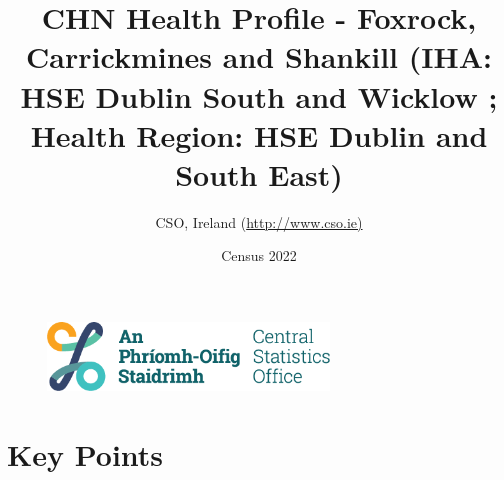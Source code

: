 \documentclass{article}
\title{CHN Health Profile - Foxrock, Carrickmines and Shankill (IHA: HSE Dublin South and Wicklow ;  Health Region: HSE Dublin and South East) }
\date{Census 2022}
\author{CSO, Ireland  (\url{http://www.cso.ie)}}
\begin{document}


\begin{figure}
	\centering
\includegraphics[width =75mm]{../figures/CSO_Logo.png}
\end{figure}

				 
		   
						  
														  
																																													
												 
			 
\maketitle
					
													   
				 
						 
																																																																											   
				 
				  
  \pagebreak
    	    \tableofcontents

\pagebreak


\section{Key Points}
\end{document}

